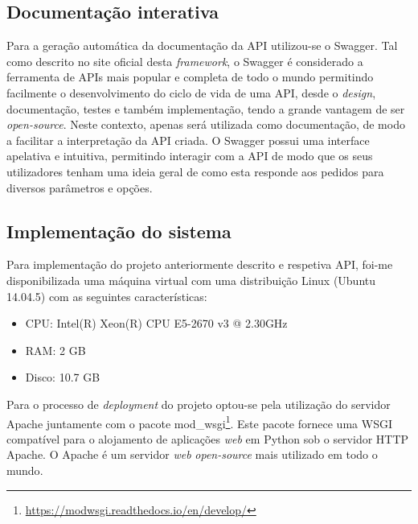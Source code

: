 \subsection{Documentação interativa}


Para a geração automática da documentação da \ac{API} utilizou-se o Swagger. Tal como descrito no site oficial desta \textit{framework}\cite{SmartBearSoftware2017}, o Swagger é considerado a ferramenta de APIs mais popular e completa de todo o mundo permitindo facilmente o desenvolvimento do ciclo de vida de uma \ac{API}, desde o \textit{design}, documentação, testes e também implementação, tendo a grande vantagem de ser \textit{open-source}. Neste contexto, apenas será utilizada como documentação, de modo a facilitar a interpretação da \ac{API} criada. O Swagger possui uma interface apelativa e intuitiva, permitindo interagir com a \ac{API} de modo que os seus utilizadores tenham uma ideia geral de como esta responde aos pedidos para diversos parâmetros e opções. 





\subsection{Implementação do sistema}

Para implementação do projeto anteriormente descrito e respetiva API, foi-me disponibilizada uma máquina virtual com uma distribuição Linux (Ubuntu 14.04.5) com as seguintes características: 

\begin{itemize}
	\item \ac{CPU}: Intel(R) Xeon(R) CPU E5-2670 v3 @ 2.30GHz
	\item \ac{RAM}: 2 GB
	\item Disco: 10.7 GB
\end{itemize}


Para o processo de \textit{deployment} do projeto optou-se pela utilização do servidor Apache juntamente com o pacote mod\_wsgi\footnote{\url{https://modwsgi.readthedocs.io/en/develop/}}. 
Este pacote fornece uma \ac{WSGI} compatível para o alojamento de aplicações \textit{web} em Python sob o servidor \ac{HTTP} Apache. O Apache é um servidor \textit{web} \textit{open-source} mais utilizado em todo o mundo\cite{TheApacheSoftwareFoundation2016}.







